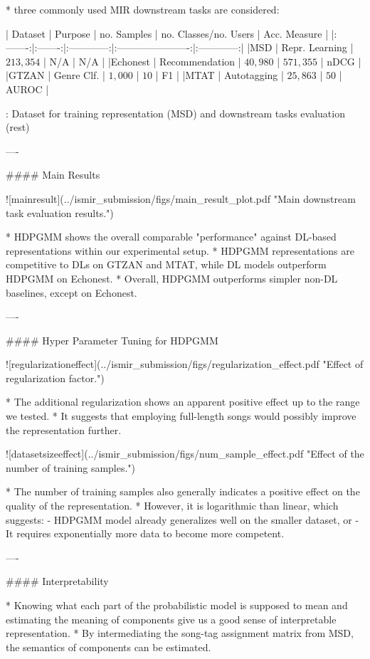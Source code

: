 \documentclass{beamer}
\begin{document}
\begin{frame}[fragile]
\begin{columns}[T]
\begin{column}{.46\textwidth}
\begin{markdown}
* three commonly used MIR downstream tasks are considered:

| Dataset | Purpose | no. Samples  | no. Classes/no. Users  | Acc. Measure |
|:-------:|:-------:|:------------:|:----------------------:|:------------:|
|MSD      | Repr. Learning | $213,354$ | N/A               | N/A          |
|Echonest | Recommendation | $40,980$  | $571,355$         | nDCG         |
|GTZAN    | Genre Clf. | $1,000$   | $10$              | F1           |
|MTAT     | Autotagging | $25,863$  | $50$              | AUROC        |

  : Dataset for training representation (MSD) and downstream tasks evaluation (rest)

----

#### Main Results

![mainresult](../ismir_submission/figs/main_result_plot.pdf "Main downstream task evaluation results.")

* HDPGMM shows the overall comparable "performance" against DL-based representations within our experimental setup.
* HDPGMM representations are competitive to DLs on GTZAN and MTAT, while DL models outperform HDPGMM on Echonest.
* Overall, HDPGMM outperforms simpler non-DL baselines, except on Echonest.

----

#### Hyper Parameter Tuning for HDPGMM

![regularizationeffect](../ismir_submission/figs/regularization_effect.pdf "Effect of regularization factor.")

* The additional regularization shows an apparent positive effect up to the range we tested.
* It suggests that employing full-length songs would possibly improve the representation further.


![datasetsizeeffect](../ismir_submission/figs/num_sample_effect.pdf "Effect of the number of training samples.")

* The number of training samples also generally indicates a positive effect on the quality of the representation.
* However, it is logarithmic than linear, which suggests:
    - HDPGMM model already generalizes well on the smaller dataset, or
    - It requires exponentially more data to become more competent.

----


#### Interpretability

* Knowing what each part of the probabilistic model is supposed to mean and estimating the meaning of components give us a good sense of interpretable representation.
* By intermediating the song-tag assignment matrix from MSD, the semantics of components can be estimated.



\end{markdown}
\end{column}
\end{columns}
\end{frame}
\end{document}
